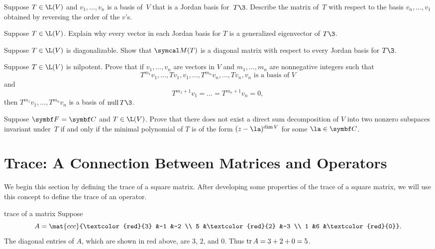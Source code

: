 \begin{exercises}
\exercise
Suppose $T \in \L(V)$ and $v_1, \dots, v_n$ is a basis of~$V$ that is a Jordan
basis for~$T\3$. Describe the matrix of~$T$ with respect to the basis
$v_n, \dots, v_1$ obtained by reversing the order of the $v$'s.


\exercise
Suppose $T \in \L(V)$. Explain why every vector in each Jordan basis for $T$ is a generalized eigenvector of $T\3$.\label{8JorGenEig}


\exercise
Suppose $T \in \L(V)$ is diagonalizable. Show that $\M(T)$ is a diagonal matrix with respect to every Jordan basis for $T\3$.


\exercise
Suppose $T \in \L(V)$ is nilpotent. Prove that if $v_1, \dots, v_n$ are vectors in $V$ and $m_1, \dots, m_n$ are nonnegative integers such that
\[
T^{m_1}v_1, \dots, Tv_1, v_1, \dots, T^{m_n}v_n, \dots, Tv_n, v_n \text{ is a basis of } V
\]
and
\[
T^{m_1 + 1} v_1 = \dots = T^{m_n + 1} v_n = 0,
\]
then $T^{m_1}v_1, \dots, T^{m_n}v_n$ is a basis of $\ker T\3$.


\exercise
Suppose $\F{} = \C{}$ and $T \in \L(V)$.  Prove that there
does not exist a direct sum decomposition of $V$ into two nonzero subspaces
invariant under~$T$ if and only if the minimal polynomial of $T$ is of the form
$(z - \la)^{\dim V}$ for some $\la \in \C{}$.


\end{exercises}

\section{Trace: A Connection Between Matrices and Operators} \label{7trace}

We begin this section by defining the trace of a square matrix. After developing some properties of the trace of a square matrix, we will use this concept to define the trace of an operator.


\begin{example}{trace of a  matrix}
Suppose
\[
A = \mat{ccc}{\textcolor{red}{3} &-1 &-2 \\ 5 &\textcolor{red}{2} &-3 \\ 1 &6 &\textcolor{red}{0}}.
\]
The diagonal entries of $A$, which are shown in red above, are $3$, $2$, and $0$. Thus $\operatorname{tr} A = 3 + 2 + 0 = 5$.
\end{example}

